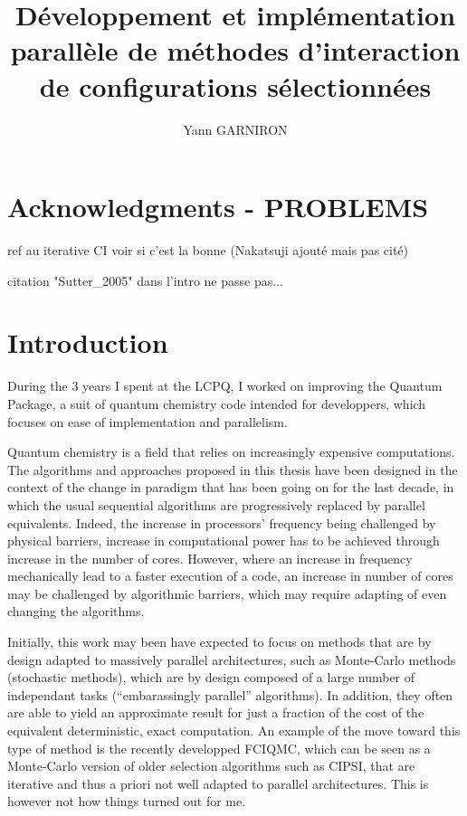 \documentclass[12pt,a4paper]{report}
\title{Développement et implémentation parallèle de méthodes d'interaction de configurations sélectionnées}
\author{Yann GARNIRON}
\begin{document}
\dominitoc


\newpage

\chapter*{Acknowledgments - PROBLEMS}





ref au iterative CI voir si c'est la bonne (Nakatsuji ajouté mais pas cité)

citation "Sutter\_2005" dans l'intro ne passe pas...


\newpage

\tableofcontents
\newpage


\chapter{Introduction}

During the 3 years I spent at the LCPQ, I worked on improving the Quantum Package, a suit of quantum chemistry code intended for developpers, which focuses on ease of implementation and parallelism.

Quantum chemistry is a field that relies on increasingly expensive computations. The algorithms and approaches proposed in this thesis have been designed in the context of the change in paradigm that has been going on for the last decade,\cite{Sutter_2005} in which the usual sequential algorithms are progressively replaced by parallel equivalents. Indeed, the increase in processors' frequency being challenged by physical barriers, increase in computational power has to be achieved through increase in the number of cores. However, where an increase in frequency mechanically lead to a faster execution of a code, an increase in number of cores may be challenged by algorithmic barriers, which may require adapting of even changing the algorithms.

Initially, this work may been have expected to focus on methods that are by design adapted to massively parallel architectures, such as Monte-Carlo methods (stochastic methods), which are by design composed of a large number of independant tasks (``embarassingly parallel'' algorithms). In addition, they often are able to yield an approximate result for just a fraction of the cost of the equivalent deterministic, exact computation. An example of the move toward this type of method is the recently developped FCIQMC, which can be seen as a Monte-Carlo version of older selection algorithms such as CIPSI, that are iterative and thus a priori not well adapted to parallel architectures. This is however not how things turned out for me.
\end{document}
